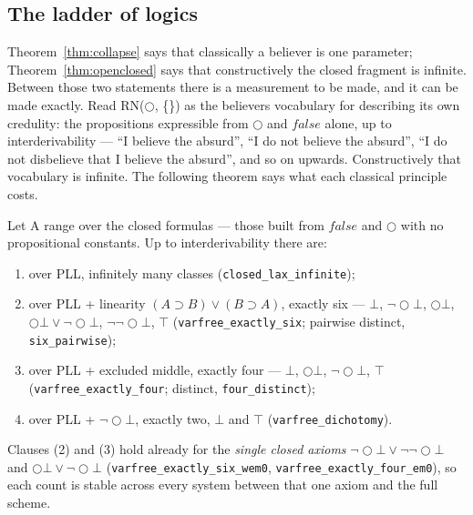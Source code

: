 \subsection{The ladder of logics}\label{31-the-ladder-of-logics}

Theorem~\ref{thm:collapse} says that classically a believer is one
parameter; Theorem~\ref{thm:openclosed} says that constructively the
closed fragment is infinite. Between those two statements there is a
measurement to be made, and it can be made exactly. Read
RN(\ensuremath{\bigcirc}, \{\}) as the believer\textquotesingle s vocabulary for
describing its own credulity: the propositions expressible from
\ensuremath{\bigcirc} and \ensuremath{\mathit{false}} alone, up to
interderivability --- ``I believe the absurd'', ``I do not believe the
absurd'', ``I do not disbelieve that I believe the absurd'', and so on
upwards. Constructively that vocabulary is infinite. The following
theorem says what each classical principle costs.

\begin{theorem}\label{thm:ladder}
Let A range over the closed formulas --- those built from
\ensuremath{\mathit{false}} and \ensuremath{\bigcirc} with no propositional
constants. Up to interderivability there are:
\begin{enumerate}
\item over PLL, infinitely many classes (\texttt{closed\_lax\_infinite});
\item over PLL + linearity \ensuremath{(A \supset B) \vee (B \supset A)},
  exactly six --- \ensuremath{\bot}, \ensuremath{\lnot\bigcirc\bot},
  \ensuremath{\bigcirc\bot},
  \ensuremath{\bigcirc\bot \vee \lnot\bigcirc\bot},
  \ensuremath{\lnot\lnot\bigcirc\bot}, \ensuremath{\top}
  (\texttt{varfree\_exactly\_six}; pairwise distinct, \texttt{six\_pairwise});
\item over PLL + excluded middle, exactly four --- \ensuremath{\bot},
  \ensuremath{\bigcirc\bot}, \ensuremath{\lnot\bigcirc\bot}, \ensuremath{\top}
  (\texttt{varfree\_exactly\_four}; distinct, \texttt{four\_distinct});
\item over PLL + \ensuremath{\lnot\bigcirc\bot}, exactly two, \ensuremath{\bot}
  and \ensuremath{\top} (\texttt{varfree\_dichotomy}).
\end{enumerate}
Clauses (2) and (3) hold already for the \emph{single closed axioms}
\ensuremath{\lnot\bigcirc\bot \vee \lnot\lnot\bigcirc\bot} and
\ensuremath{\bigcirc\bot \vee \lnot\bigcirc\bot}
(\texttt{varfree\_exactly\_six\_wem0},
\texttt{varfree\_exactly\_four\_em0}), so each count is stable across every
system between that one axiom and the full scheme.
\end{theorem}

